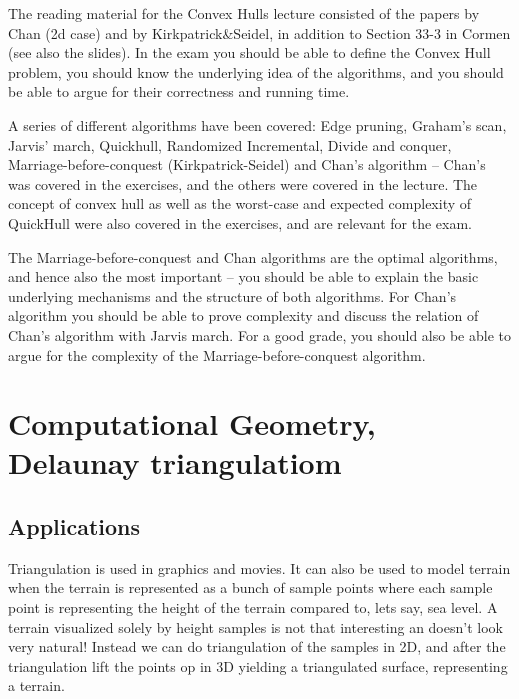 \documentclass[10pt]{article}
\begin{document}
 
The reading material for the Convex Hulls lecture consisted of the papers by Chan (2d case) and by Kirkpatrick\&Seidel, in addition to Section 33-3 in Cormen (see also the slides). In the exam you should be able to define the Convex Hull problem, you should know the underlying idea of the algorithms, and you should be able to argue for their correctness and running time.

A series of different algorithms have been covered: Edge pruning, Graham's scan, Jarvis' march, Quickhull, Randomized Incremental, Divide and conquer, Marriage-before-conquest (Kirkpatrick-Seidel) and Chan's algorithm -- Chan's was covered in the exercises, and the others were covered in the lecture. The concept of convex hull as well as the worst-case and expected complexity of QuickHull were also covered in the exercises, and are relevant for the exam.

The Marriage-before-conquest and Chan algorithms are the optimal algorithms, and hence also the most important -- you should be able to explain the basic underlying mechanisms and the structure of both algorithms. For Chan's algorithm you should be able to prove complexity and discuss the relation of Chan's algorithm with Jarvis march. For a good grade, you should also be able to argue for the complexity of the Marriage-before-conquest algorithm.



\clearpage \newpage
\section{Computational Geometry, Delaunay triangulatiom} %
\label{sec:computational_geometry_delaunay_triangulatiom}


\subsection{Applications} %
\label{sub:applications}
Triangulation is used in graphics and movies. It can also be used to model terrain when the terrain is represented as a bunch of sample points where each sample point is representing the height of the terrain compared to, lets say, sea level. A terrain visualized solely by height samples is not that interesting an doesn't look very natural! Instead we can do triangulation of the samples in 2D, and after the triangulation lift the points op in 3D yielding a triangulated surface, representing a terrain. 
\end{document}
